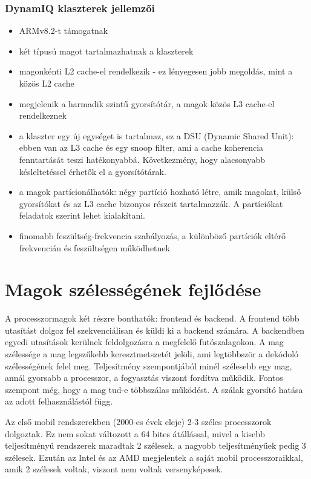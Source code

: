 \subsubsection{DynamIQ klaszterek jellemzői}
\begin{itemize}
    \item ARMv8.2-t támogatnak
    \item két típusú magot tartalmazhatnak a klaszterek
    \item magonkénti L2 cache-el rendelkezik - ez lényegesen jobb megoldás, mint a közös L2 cache
    \item megjelenik a harmadik szintű gyorsítótár, a magok közös L3 cache-el rendelkeznek
    \item a klaszter egy új egységet is tartalmaz, ez a DSU (Dynamic Shared Unit): ebben van az L3 cache és egy snoop filter, ami a cache koherencia fenntartását teszi hatékonyabbá. Következmény, hogy alacsonyabb késleltetéssel érhetők el a gyorsítótárak.
    \item a magok partícionálhatók: négy partíció hozható létre, amik magokat, külső gyorsítókat és az L3 cache bizonyos részeit tartalmazzák. A partíciókat feladatok szerint lehet kialakítani.
    \item finomabb feszültség-frekvencia szabályozás, a különböző partíciók eltérő frekvencián és feszültségen működhetnek
\end{itemize}

\section{Magok szélességének fejlődése}
A processzormagok két részre bonthatók: frontend és backend.
A frontend több utasítást dolgoz fel szekvenciálisan és küldi ki a backend számára.
A backendben egyedi utasítások kerülnek feldolgozásra a megfelelő futószalagokon.
A mag szélessége a mag legszűkebb keresztmetszetét jelöli, ami legtöbbször a dekódoló szélességének felel meg.
Teljesítmény szempontjából minél szélesebb egy mag, annál gyorsabb a processzor, a fogyasztás viszont fordítva működik.
Fontos szempont még, hogy a mag tud-e többszálas működést.
A szálak gyorsító hatása az adott felhasználástól függ.

Az első mobil rendszerekben (2000-es évek eleje) 2-3 széles processzorok dolgoztak.
Ez nem sokat változott a 64 bites átállással, mivel a kisebb teljesítményű rendszerek maradtak 2 szélesek, a nagyobb teljesítményűek pedig 3 szélesek.
Ezután az Intel és az AMD megjelentek a saját mobil processzoraikkal, amik 2 szélesek voltak, viszont nem voltak versenyképesek.

